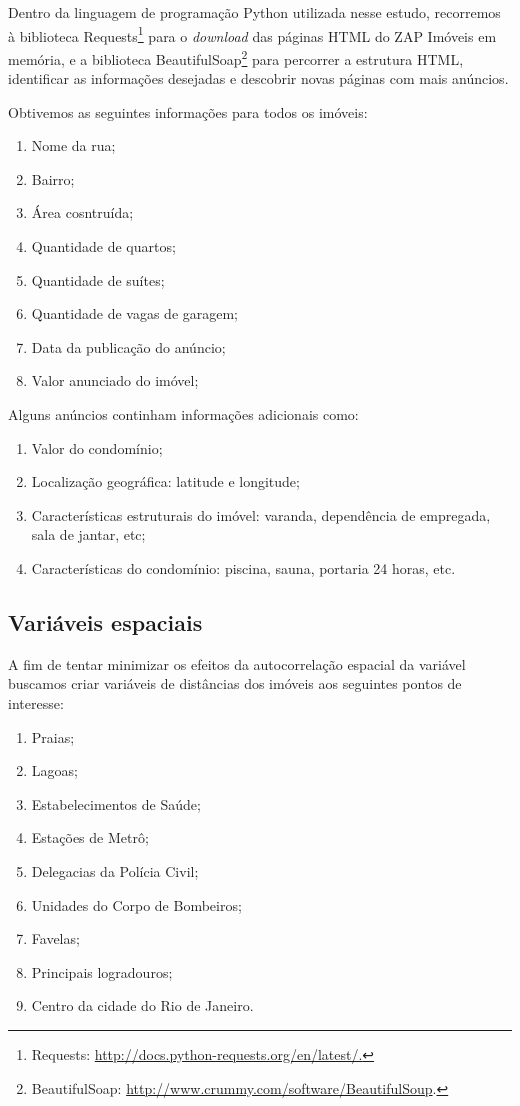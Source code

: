 Dentro da linguagem de programação Python utilizada nesse estudo, recorremos à biblioteca Requests\footnote{Requests: \url{http://docs.python-requests.org/en/latest/.}} para o \textit{download} das páginas HTML do ZAP Imóveis em memória, e a  biblioteca BeautifulSoap\footnote{BeautifulSoap: \url{http://www.crummy.com/software/BeautifulSoup}.} para percorrer a estrutura HTML, identificar as informações desejadas e descobrir novas páginas com mais anúncios.

Obtivemos as seguintes informações para todos os imóveis:

\begin{enumerate}
\item Nome da rua;
\item Bairro;
\item Área cosntruída;
\item Quantidade de quartos;
\item Quantidade de suítes;
\item Quantidade de vagas de garagem;
\item Data da publicação do anúncio;
\item Valor anunciado do imóvel;
\end{enumerate}

Alguns anúncios continham informações adicionais como:
\begin{enumerate}
\item Valor do condomínio;
\item Localização geográfica: latitude e longitude;
\item Características estruturais do imóvel: varanda, dependência de empregada, sala de jantar, etc;
\item Características do condomínio: piscina, sauna, portaria 24 horas, etc.
\end{enumerate}

\subsection{Variáveis espaciais}

A fim de tentar minimizar os efeitos da autocorrelação espacial da variável  buscamos criar variáveis de distâncias dos imóveis aos seguintes pontos de interesse:

\begin{enumerate}
\item Praias;
\item Lagoas;
\item Estabelecimentos de Saúde;
\item Estações de Metrô;
\item Delegacias da Polícia Civil;
\item Unidades do Corpo de Bombeiros;
\item Favelas;
\item Principais logradouros;
\item Centro da cidade do Rio de Janeiro.
\end{enumerate}

